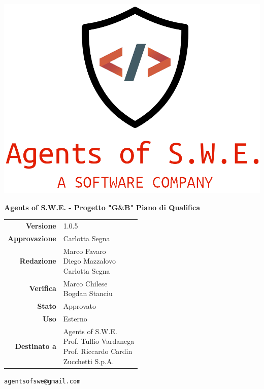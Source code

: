 

\usepackage{float}


\begin{titlepage}
\thispagestyle{empty}

\begin{center}

\includegraphics[scale=0.3]{./images/logo.png} 

\large \textbf{Agents of S.W.E. - Progetto "G\&B"}
\vfill
\Huge \textbf{Piano di Qualifica}
\vfill
\large
\renewcommand{\arraystretch}{1.3}
\begin{tabular}{r|l}
\textbf{Versione} & 1.0.5\\
\textbf{Approvazione} & Carlotta Segna\\
\textbf{Redazione} & \parbox[t]{5cm}{Marco Favaro\\Diego Mazzalovo\\Carlotta Segna}\\
\textbf{Verifica} & \parbox[t]{5cm}{Marco Chilese\\Bogdan Stanciu}\\
\textbf{Stato} & Approvato\\
\textbf{Uso} & Esterno\\
\textbf{Destinato a} & \parbox[t]{5cm}{Agents of S.W.E. \\Prof. Tullio Vardanega\\Prof. Riccardo Cardin\\Zucchetti S.p.A.}
\end{tabular}
\vfill
\small
\texttt{agentsofswe@gmail.com}
\end{center}
\end{titlepage}

